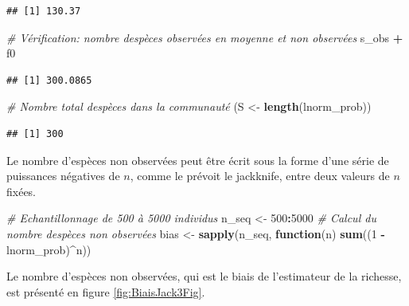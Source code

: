 \documentclass[
  11pt,
  american,
  a4paper,
  extrafontsizes,onecolumn,openright
  ]{memoir}
\newenvironment{Shaded}{\begin{snugshade}}{\end{snugshade}}
\newcommand{\CommentTok}[1]{\textcolor[rgb]{0.56,0.35,0.01}{\textit{#1}}}
\newcommand{\ControlFlowTok}[1]{\textcolor[rgb]{0.13,0.29,0.53}{\textbf{#1}}}
\newcommand{\DecValTok}[1]{\textcolor[rgb]{0.00,0.00,0.81}{#1}}
\newcommand{\FunctionTok}[1]{\textcolor[rgb]{0.13,0.29,0.53}{\textbf{#1}}}
\newcommand{\NormalTok}[1]{#1}
\newcommand{\OtherTok}[1]{\textcolor[rgb]{0.56,0.35,0.01}{#1}}
\newcommand{\SpecialCharTok}[1]{\textcolor[rgb]{0.81,0.36,0.00}{\textbf{#1}}}
\begin{document}
\begin{verbatim}
## [1] 130.37
\end{verbatim}

\begin{Shaded}
\begin{Highlighting}[]
\CommentTok{\# Vérification: nombre d\textquotesingle{}espèces observées en moyenne et non observées}
\NormalTok{s\_obs }\SpecialCharTok{+}\NormalTok{ f0}
\end{Highlighting}
\end{Shaded}

\begin{verbatim}
## [1] 300.0865
\end{verbatim}

\begin{Shaded}
\begin{Highlighting}[]
\CommentTok{\# Nombre total d\textquotesingle{}espèces dans la communauté}
\NormalTok{(S }\OtherTok{\textless{}{-}} \FunctionTok{length}\NormalTok{(lnorm\_prob))}
\end{Highlighting}
\end{Shaded}

\begin{verbatim}
## [1] 300
\end{verbatim}

\normalsize

Le nombre d'espèces non observées peut être écrit sous la forme d'une série de puissances négatives de \(n\), comme le prévoit le jackknife, entre deux valeurs de \(n\) fixées.

\scriptsize

\begin{Shaded}
\begin{Highlighting}[]
\CommentTok{\# Echantillonnage de 500 à 5000 individus}
\NormalTok{n\_seq }\OtherTok{\textless{}{-}} \DecValTok{500}\SpecialCharTok{:}\DecValTok{5000}
\CommentTok{\# Calcul du nombre d\textquotesingle{}espèces non observées}
\NormalTok{bias }\OtherTok{\textless{}{-}} \FunctionTok{sapply}\NormalTok{(n\_seq, }\ControlFlowTok{function}\NormalTok{(n) }\FunctionTok{sum}\NormalTok{((}\DecValTok{1} \SpecialCharTok{{-}}\NormalTok{ lnorm\_prob)}\SpecialCharTok{\^{}}\NormalTok{n))}
\end{Highlighting}
\end{Shaded}

\normalsize

Le nombre d'espèces non observées, qui est le biais de l'estimateur de la richesse, est présenté en figure \ref{fig:BiaisJack3Fig}.
\end{document}
